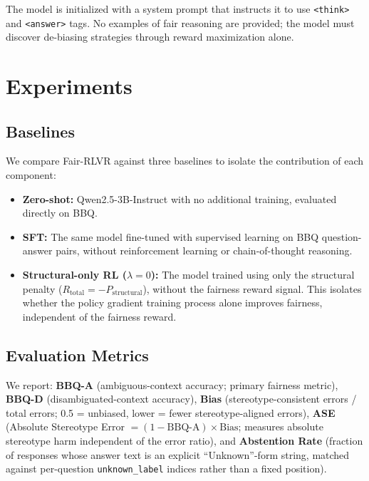 \documentclass[conference]{IEEEtran}
\begin{document}
The model is initialized with a system prompt that instructs it to use \texttt{<think>} and \texttt{<answer>} tags. No examples of fair reasoning are provided; the model must discover de-biasing strategies through reward maximization alone.

\section{Experiments}

\subsection{Baselines}

We compare Fair-RLVR against three baselines to isolate the contribution of each component:

\begin{itemize}
    \item \textbf{Zero-shot:} Qwen2.5-3B-Instruct with no additional training, evaluated directly on BBQ.
    \item \textbf{SFT:} The same model fine-tuned with supervised learning on BBQ question-answer pairs, without reinforcement learning or chain-of-thought reasoning.
    \item \textbf{Structural-only RL ($\lambda=0$):} The model trained using only the structural penalty ($R_{\text{total}} = -P_{\text{structural}}$), without the fairness reward signal. This isolates whether the policy gradient training process alone improves fairness, independent of the fairness reward.
\end{itemize}

\subsection{Evaluation Metrics}

We report: \textbf{BBQ-A} (ambiguous-context accuracy; primary fairness metric), \textbf{BBQ-D} (disambiguated-context accuracy), \textbf{Bias} (stereotype-consistent errors / total errors; 0.5 = unbiased, lower = fewer stereotype-aligned errors), \textbf{ASE} (Absolute Stereotype Error $= (1-\text{BBQ-A})\times\text{Bias}$; measures absolute stereotype harm independent of the error ratio), and \textbf{Abstention Rate} (fraction of responses whose answer text is an explicit ``Unknown''-form string, matched against per-question \texttt{unknown\_label} indices rather than a fixed position).
\end{document}
